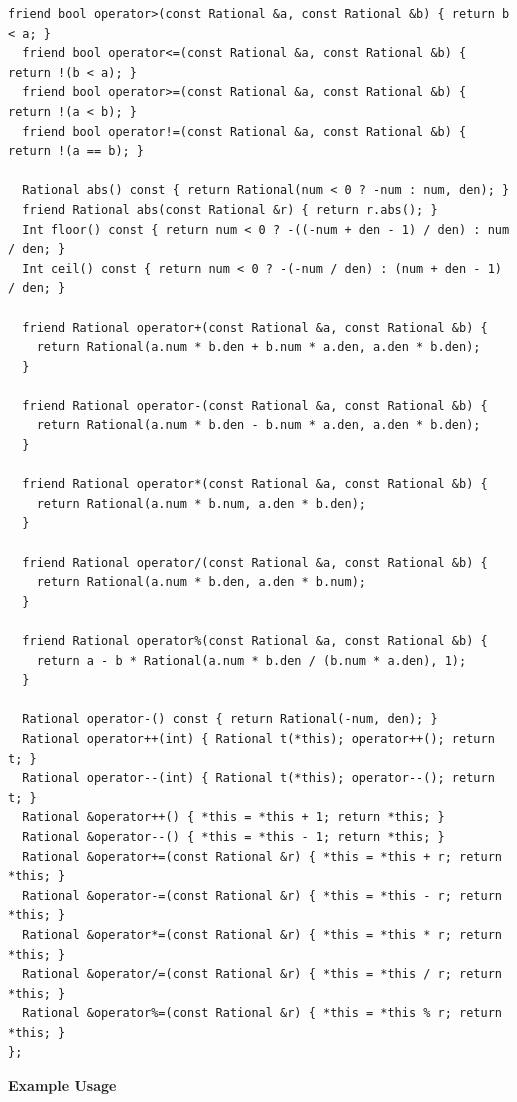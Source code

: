 \begin{lstlisting}[style=cpp]
  friend bool operator>(const Rational &a, const Rational &b) { return b < a; }
  friend bool operator<=(const Rational &a, const Rational &b) { return !(b < a); }
  friend bool operator>=(const Rational &a, const Rational &b) { return !(a < b); }
  friend bool operator!=(const Rational &a, const Rational &b) { return !(a == b); }

  Rational abs() const { return Rational(num < 0 ? -num : num, den); }
  friend Rational abs(const Rational &r) { return r.abs(); }
  Int floor() const { return num < 0 ? -((-num + den - 1) / den) : num / den; }
  Int ceil() const { return num < 0 ? -(-num / den) : (num + den - 1) / den; }

  friend Rational operator+(const Rational &a, const Rational &b) {
    return Rational(a.num * b.den + b.num * a.den, a.den * b.den);
  }

  friend Rational operator-(const Rational &a, const Rational &b) {
    return Rational(a.num * b.den - b.num * a.den, a.den * b.den);
  }

  friend Rational operator*(const Rational &a, const Rational &b) {
    return Rational(a.num * b.num, a.den * b.den);
  }

  friend Rational operator/(const Rational &a, const Rational &b) {
    return Rational(a.num * b.den, a.den * b.num);
  }

  friend Rational operator%(const Rational &a, const Rational &b) {
    return a - b * Rational(a.num * b.den / (b.num * a.den), 1);
  }

  Rational operator-() const { return Rational(-num, den); }
  Rational operator++(int) { Rational t(*this); operator++(); return t; }
  Rational operator--(int) { Rational t(*this); operator--(); return t; }
  Rational &operator++() { *this = *this + 1; return *this; }
  Rational &operator--() { *this = *this - 1; return *this; }
  Rational &operator+=(const Rational &r) { *this = *this + r; return *this; }
  Rational &operator-=(const Rational &r) { *this = *this - r; return *this; }
  Rational &operator*=(const Rational &r) { *this = *this * r; return *this; }
  Rational &operator/=(const Rational &r) { *this = *this / r; return *this; }
  Rational &operator%=(const Rational &r) { *this = *this % r; return *this; }
};
\end{lstlisting}
\textbf{Example Usage}\par
